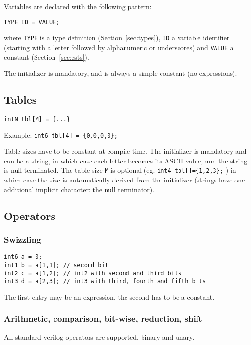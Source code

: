 \documentclass[a4]{article}
\begin{document}
Variables are declared with the following pattern:

\texttt{TYPE ID = VALUE;}

\noindent where \texttt{TYPE} is a type definition (Section~\ref{sec:types}), \texttt{ID} a variable identifier (starting with a letter followed by alphanumeric or underscores) and \texttt{VALUE} a constant (Section~\ref{sec:csts}).

The initializer is mandatory, and is always a simple constant (no expressions).

\subsection{Tables}

\texttt{intN tbl[M] = \{...\} }

\noindent Example:  \texttt{int6 tbl[4] = \{0,0,0,0\};}

\noindent Table sizes have to be constant at compile time. The initializer is mandatory and can be a string, in which case each letter becomes its ASCII value, and the string is null terminated. The table size \texttt{M} is optional (eg. \texttt{int4 tbl[]=\{1,2,3\};} ) in which case the size is automatically derived from the initializer (strings have one additional implicit character: the null terminator).

\subsection{Operators}

\subsubsection{Swizzling}

\begin{verbatim}
int6 a = 0;
int1 b = a[1,1]; // second bit
int2 c = a[1,2]; // int2 with second and third bits
int3 d = a[2,3]; // int3 with third, fourth and fifth bits
\end{verbatim}

The first entry may be an expression, the second has to be a constant.

\subsubsection{Arithmetic, comparison, bit-wise, reduction, shift}

All standard verilog operators are supported, binary and unary.
\end{document}
